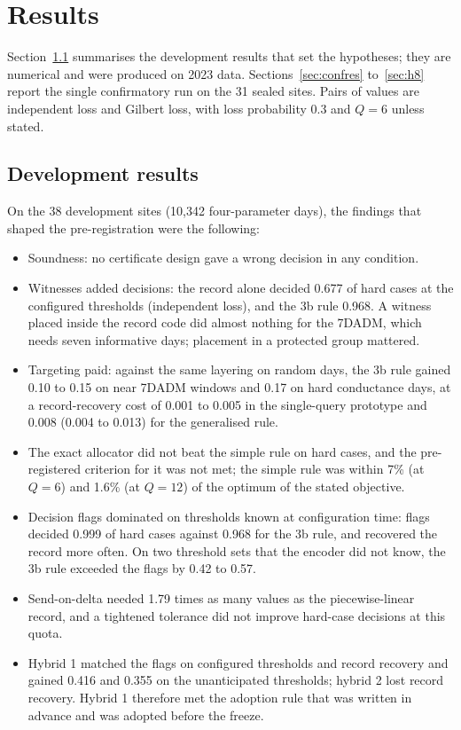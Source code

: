 \section{Results}
\label{sec:results}

Section~\ref{sec:devres} summarises the development results that set the hypotheses; they are numerical and were produced on 2023 data. Sections~\ref{sec:confres} to~\ref{sec:h8} report the single confirmatory run on the 31 sealed sites. Pairs of values are independent loss and Gilbert loss, with loss probability 0.3 and $Q = 6$ unless stated.

\subsection{Development results}
\label{sec:devres}
On the 38 development sites (10,342 four-parameter days), the findings that shaped the pre-registration were the following:
\begin{itemize}
  \item Soundness: no certificate design gave a wrong decision in any condition.
  \item Witnesses added decisions: the record alone decided 0.677 of hard cases at the configured thresholds (independent loss), and the 3b rule 0.968. A witness placed inside the record code did almost nothing for the 7DADM, which needs seven informative days; placement in a protected group mattered.
  \item Targeting paid: against the same layering on random days, the 3b rule gained 0.10 to 0.15 on near 7DADM windows and 0.17 on hard conductance days, at a record-recovery cost of 0.001 to 0.005 in the single-query prototype and 0.008 (0.004 to 0.013) for the generalised rule.
  \item The exact allocator did not beat the simple rule on hard cases, and the pre-registered criterion for it was not met; the simple rule was within 7\% (at $Q = 6$) and 1.6\% (at $Q = 12$) of the optimum of the stated objective.
  \item Decision flags dominated on thresholds known at configuration time: flags decided 0.999 of hard cases against 0.968 for the 3b rule, and recovered the record more often. On two threshold sets that the encoder did not know, the 3b rule exceeded the flags by 0.42 to 0.57.
  \item Send-on-delta needed 1.79 times as many values as the piecewise-linear record, and a tightened tolerance did not improve hard-case decisions at this quota.
  \item Hybrid 1 matched the flags on configured thresholds and record recovery and gained 0.416 and 0.355 on the unanticipated thresholds; hybrid 2 lost record recovery. Hybrid 1 therefore met the adoption rule that was written in advance and was adopted before the freeze.
\end{itemize}

